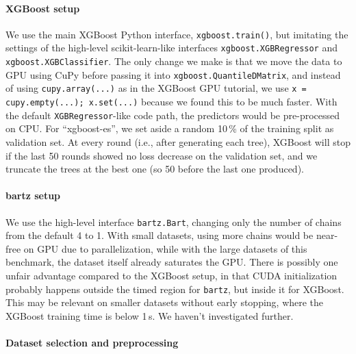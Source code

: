 \documentclass{article}
\begin{document}
\paragraph{XGBoost setup} 

We use the main XGBoost Python interface, \texttt{xgboost.train()}, but
imitating the settings of the high-level scikit-learn-like interfaces
\texttt{xgboost.XGBRegressor} and \texttt{xgboost.XGBClassifier}. The only change we make is that we move the data
to GPU using CuPy \autocite{cupy_learningsys2017} before passing it into \texttt{xgboost.QuantileDMatrix}, and
instead of using \texttt{cupy.array(...)} as in the XGBoost GPU tutorial, we
use \texttt{x = cupy.empty(...); x.set(...)} because we found this to be much
faster. With the default \texttt{XGBRegressor}-like code path, the predictors would
be pre-processed on CPU. For ``xgboost-es'', we set aside a random 10\,\% of the
training split as validation set. At every round (i.e., after generating each
tree), XGBoost will stop if the last 50 rounds showed no loss decrease on the
validation set, and we truncate the trees at the best one (so 50 before the last
one produced).

\paragraph{bartz setup}

We use the high-level interface \texttt{bartz.Bart}, changing only the number
of chains from the default 4 to 1. With small datasets, using more chains would
be near-free on GPU due to parallelization, while with the large datasets of
this benchmark, the dataset itself already saturates the GPU. There is possibly
one unfair advantage compared to the XGBoost setup, in that CUDA initialization
probably happens outside the timed region for \texttt{bartz}, but inside it for
XGBoost. This may be relevant on smaller datasets without early stopping, where
the XGBoost training time is below 1\,s. We haven't investigated further.

\paragraph{Dataset selection and preprocessing}
\end{document}
